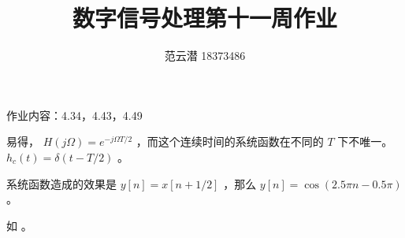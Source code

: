 \documentclass[lang=cn,11pt,a4paper,cite=authoryear,twocolumn]{elegantpaper}
\title{数字信号处理\quad 第十一周作业}
\author{范云潜 18373486}
\institute{微电子学院 184111 班}
\date{\zhtoday}
\begin{document}
\maketitle

作业内容：4.34，4.43，4.49 




易得， \(H(j\Omega) = e^{-j\Omega T / 2}\) ，而这个连续时间的系统函数在不同的 \(T\) 下不唯一。 \(h_c(t) = \delta(t-T/2)\) 。


系统函数造成的效果是 \(y[n] = x[n+1/2]\) ，那么 \(y[n] = \cos (2.5 \pi n - 0.5 \pi )\) 。

如 。







\end{document}
